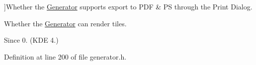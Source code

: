 \begin{Desc}
\begin{description}
{}]Whether the \hyperlink{classOkular_1_1Generator}{Generator} supports export to P\+D\+F \& P\+S through the Print Dialog. \item[{\em 
\hypertarget{classOkular_1_1Generator_a8517096896273a5ba5b970be09313c77a5ab094fe848056a0687d8a3c31c7fd4a}{Tiled\+Rendering}\label{classOkular_1_1Generator_a8517096896273a5ba5b970be09313c77a5ab094fe848056a0687d8a3c31c7fd4a}
}]Whether the \hyperlink{classOkular_1_1Generator}{Generator} can render tiles. \begin{DoxySince}{Since}
0. (K\+D\+E 4.) 
\end{DoxySince}
\end{description}
\end{Desc}


Definition at line 200 of file generator.\+h.



